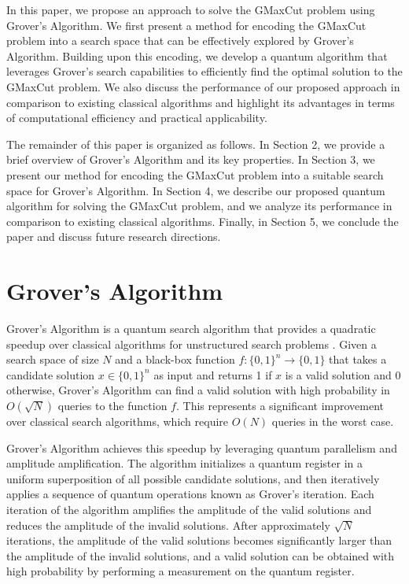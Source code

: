 In this paper, we propose an approach to solve the GMaxCut problem using Grover's Algorithm. We first present a method for encoding the GMaxCut problem into a search space that can be effectively explored by Grover's Algorithm. Building upon this encoding, we develop a quantum algorithm that leverages Grover's search capabilities to efficiently find the optimal solution to the GMaxCut problem. We also discuss the performance of our proposed approach in comparison to existing classical algorithms and highlight its advantages in terms of computational efficiency and practical applicability.

The remainder of this paper is organized as follows. In Section 2, we provide a brief overview of Grover's Algorithm and its key properties. In Section 3, we present our method for encoding the GMaxCut problem into a suitable search space for Grover's Algorithm. In Section 4, we describe our proposed quantum algorithm for solving the GMaxCut problem, and we analyze its performance in comparison to existing classical algorithms. Finally, in Section 5, we conclude the paper and discuss future research directions.

\section{Grover's Algorithm}

Grover's Algorithm is a quantum search algorithm that provides a quadratic speedup over classical algorithms for unstructured search problems \cite{grover1996fast}. Given a search space of size $N$ and a black-box function $f: \{0, 1\}^n \rightarrow \{0, 1\}$ that takes a candidate solution $x \in \{0, 1\}^n$ as input and returns 1 if $x$ is a valid solution and 0 otherwise, Grover's Algorithm can find a valid solution with high probability in $O(\sqrt{N})$ queries to the function $f$. This represents a significant improvement over classical search algorithms, which require $O(N)$ queries in the worst case.

Grover's Algorithm achieves this speedup by leveraging quantum parallelism and amplitude amplification. The algorithm initializes a quantum register in a uniform superposition of all possible candidate solutions, and then iteratively applies a sequence of quantum operations known as Grover's iteration. Each iteration of the algorithm amplifies the amplitude of the valid solutions and reduces the amplitude of the invalid solutions. After approximately $\sqrt{N}$ iterations, the amplitude of the valid solutions becomes significantly larger than the amplitude of the invalid solutions, and a valid solution can be obtained with high probability by performing a measurement on the quantum register.

